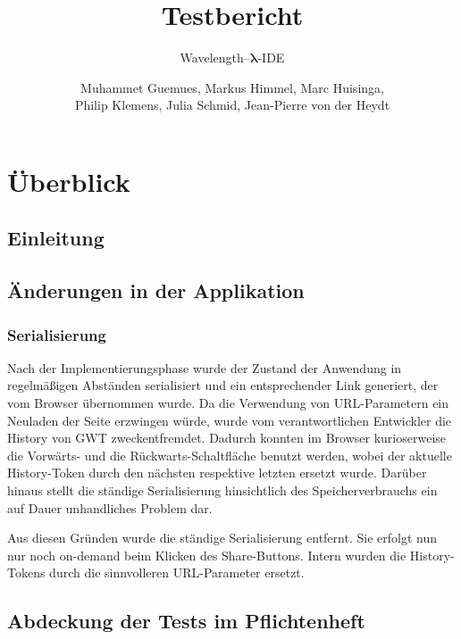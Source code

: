 \documentclass[parskip=full,11pt,openany]{scrreprt}
\title{Testbericht}
\subtitle{Wavelength--$\bm{\lambda}$-IDE}
\author{Muhammet Guemues, Markus Himmel, Marc Huisinga,\\Philip Klemens, Julia Schmid, Jean-Pierre von der Heydt}
\begin{document}
\maketitle
\newpage
\tableofcontents
\newpage

\chapter{Überblick}

\section{Einleitung}

\section{Änderungen in der Applikation}
\subsection{Serialisierung}
Nach der Implementierungsphase wurde der Zustand der Anwendung in regelmäßigen Abständen serialisiert und 
ein entsprechender Link generiert, der vom Browser übernommen wurde.
Da die Verwendung von URL-Parametern ein Neuladen der Seite erzwingen würde, wurde vom verantwortlichen 
Entwickler die History von GWT zweckentfremdet.
Dadurch konnten im Browser kurioserweise die Vorwärts- und die Rückwarts-Schaltfläche benutzt werden, wobei
der aktuelle History-Token durch den nächsten respektive letzten ersetzt wurde.
Darüber hinaus stellt die ständige Serialisierung hinsichtlich des Speicherverbrauchs ein auf Dauer unhandliches
Problem dar.

Aus diesen Gründen wurde die ständige Serialisierung entfernt. Sie erfolgt nun nur noch on-demand beim Klicken
des Share-Buttons. Intern wurden die History-Tokens durch die sinnvolleren URL-Parameter ersetzt.

\section{Abdeckung der Tests im Pflichtenheft}

\end{document}
